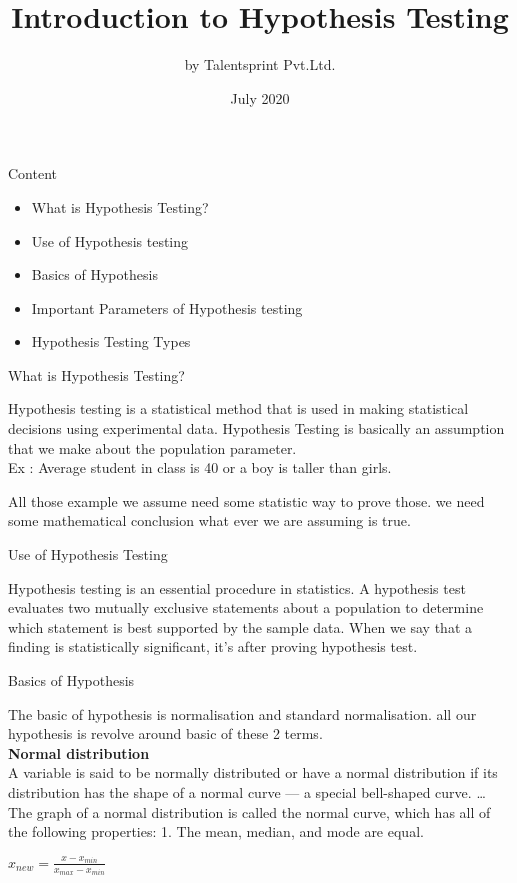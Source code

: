 \documentclass{beamer}
\title{Introduction to Hypothesis Testing}
\author{by Talentsprint Pvt.Ltd.}
\date{July 2020}
\begin{document}
\maketitle
\begin{frame}{Content}
	\begin{itemize}
		\item What is Hypothesis Testing?
		\item Use of Hypothesis testing
		\item Basics of Hypothesis
		\item Important Parameters of Hypothesis testing
		\item Hypothesis Testing Types
	\end{itemize}
\end{frame}

\begin{frame}{What is Hypothesis Testing?}
\begin{flushleft}
	Hypothesis testing is a statistical method that is used in making statistical decisions using experimental data. Hypothesis Testing is basically an assumption that we make about the population parameter.
\\
\vspace{10pt}
	Ex : Average student in class is 40 or a boy is taller than girls.
\vspace{10pt}

All those example we assume need some statistic way to prove those. we need some mathematical conclusion what ever we are assuming is true.

\end{flushleft}
\end{frame}

\begin{frame}{Use of Hypothesis Testing}
	\begin{flushleft}
		Hypothesis testing is an essential procedure in statistics. A hypothesis test evaluates two mutually exclusive statements about a population to determine which statement is best supported by the sample data. When we say that a finding is statistically significant, it’s after proving hypothesis test.
	\end{flushleft}
\end{frame}

\begin{frame}{Basics of Hypothesis}
	\begin{flushleft}
		The basic of hypothesis is normalisation and standard normalisation. all our hypothesis is revolve around basic of these 2 terms.
\\
\vspace{10pt}
\textbf{Normal distribution}
\\
\vspace{10pt}
				A variable is said to be normally distributed or have a normal distribution if its distribution has the shape of a normal curve — a special bell-shaped curve. … The graph of a normal distribution is called the normal curve, which has all of the following properties: 1. The mean, median, and mode are equal.
	\end{flushleft}
	$x_{new} = \frac{x-x_{min}}{x_{max} - x_{min}}$
\end{frame}
\end{document}
